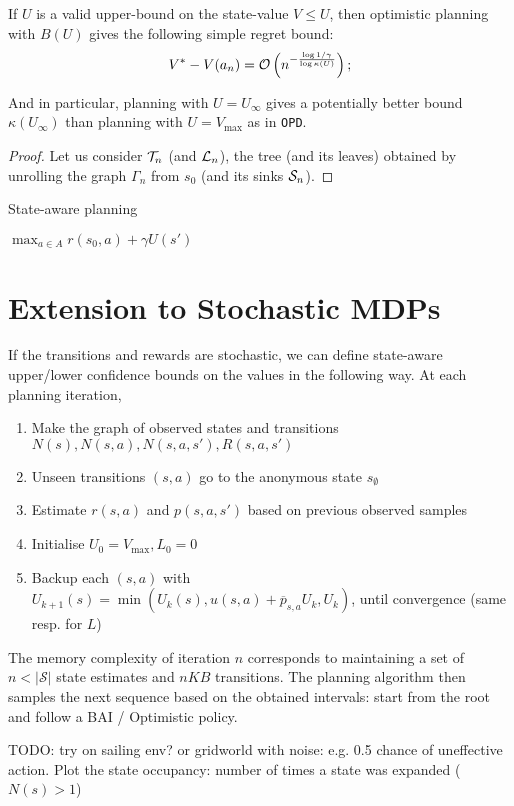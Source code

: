 \documentclass{article}
\begin{document}
\begin{theorem}
If $U$ is a valid upper-bound on the state-value $V\leq U$, then optimistic planning with $B(U)$ gives the following simple regret bound: %
\begin{align*}
V^* - V({a_n}) = \mathcal{O}\left(n^{-\frac{\log 1/\gamma}{\log \kappa(U)}}\right);
\end{align*}
\end{theorem}

And in particular, planning with $U=U_\infty$ gives a potentially better bound $\kappa(U_\infty)$ than planning with $U=V_{\max}$ as in \texttt{OPD}.

\begin{proof}
Let us consider $\mathcal{T}_n$ (and $\mathcal{L}_n$), the tree (and its leaves) obtained by unrolling the graph $\Gamma_n$ from $s_0$ (and its sinks $\mathcal{S}_n$).
\end{proof}


\begin{algorithm}[htp]
  \caption{State-aware planning}
  \label{alg:state-aware}
  \SetAlgoLined\DontPrintSemicolon
  \Return $\max_{a\in A} r(s_0,a) + \gamma U(s')$\;
\end{algorithm}


\section{Extension to Stochastic MDPs}

If the transitions and rewards are stochastic, we can define 
state-aware upper/lower confidence bounds on the values in the following way. At each planning iteration,
\begin{enumerate}
    \item Make the graph of observed states and transitions $N(s), N(s,a), N(s,a,s'), R(s,a,s')$
    \item Unseen transitions $(s,a)$ go to the anonymous state $s_\emptyset$
    \item Estimate $r(s,a)$ and $p(s,a,s')$ based on previous observed samples
    \item Initialise $U_0 = V_{\max}, L_0 = 0$
    \item Backup each $(s,a)$ with $U_{k+1}(s) = \min(U_k(s), u(s,a) + \overline{p}_{s,a} U_k, U_k)$, until convergence (same resp. for $L$)
    \end{enumerate}
The memory complexity of iteration $n$ corresponds to maintaining a set of $n < |\mathcal{S}|$ state estimates and $nKB$ transitions. The planning algorithm then samples the next sequence based on the obtained intervals: start from the root and follow a BAI / Optimistic policy.

TODO: try on sailing env? or gridworld with noise: e.g. 0.5 chance of uneffective action. Plot the state occupancy: number of times a state was expanded ($N(s) > 1$)
    
\end{document}
